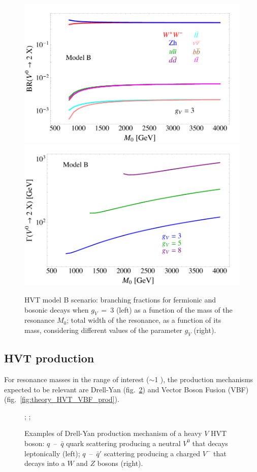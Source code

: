 \begin{figure}[!htb]
  \centering
    \includegraphics[width=.495\textwidth]{figures/Figures_BRSC.png}%
    \includegraphics[width=.495\textwidth]{figures/Figures_WidthSC.png}
  \caption{HVT model B scenario: branching fractions for fermionic and bosonic decays when $g_V~=~3$ (left) as a function of the mass of the resonance $M_0$; total width of the resonance, as a function of its mass, considering different values of the parameter $g_V$ (right).}
  \label{fig:HVT_modelB_BR_width}
\end{figure}

\subsection{HVT production}
\label{sec:theory_widths}
For resonance masses in the range of interest ($\sim$1 \TeV), the production mechanisms expected to be relevant are Drell-Yan (fig.~\ref{fig:theory_HVT_DY_prod}) and Vector Boson Fusion (VBF) (fig.~\ref{fig:theory_HVT_VBF_prod}).

\begin{figure}[!htb]
  \centering
{};
%
;
\caption{Examples of Drell-Yan production mechanism of a heavy $V$ HVT boson: $q$~--~$\bar{q}$ quark scattering producing a neutral $V^{0}$ that decays leptonically (left); $q$~--~$\bar{q}'$ scattering producing a charged $V^{-}$ that decays into a $W$ and $Z$ bosons (right).}
\label{fig:theory_HVT_DY_prod}
\end{figure}

